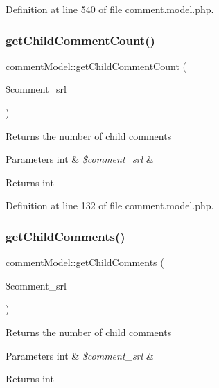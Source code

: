 Definition at line 540 of file comment.\+model.\+php.

\mbox{\label{classcommentModel_adfb890eecf72a039c9f7a28c1e6eb3d2}} 
\subsubsection{\texorpdfstring{get\+Child\+Comment\+Count()}{getChildCommentCount()}}
{\footnotesize\ttfamily comment\+Model\+::get\+Child\+Comment\+Count (\begin{DoxyParamCaption}\item[{}]{\$comment\+\_\+srl }\end{DoxyParamCaption})}

Returns the number of child comments 
\begin{DoxyParams}[1]{Parameters}
int & {\em \$comment\+\_\+srl} & \\
\hline
\end{DoxyParams}
\begin{DoxyReturn}{Returns}
int 
\end{DoxyReturn}


Definition at line 132 of file comment.\+model.\+php.

\mbox{\label{classcommentModel_ac1acb7d6d8da68e20ec5e6e5a55e5d32}} 
\subsubsection{\texorpdfstring{get\+Child\+Comments()}{getChildComments()}}
{\footnotesize\ttfamily comment\+Model\+::get\+Child\+Comments (\begin{DoxyParamCaption}\item[{}]{\$comment\+\_\+srl }\end{DoxyParamCaption})}

Returns the number of child comments 
\begin{DoxyParams}[1]{Parameters}
int & {\em \$comment\+\_\+srl} & \\
\hline
\end{DoxyParams}
\begin{DoxyReturn}{Returns}
int 
\end{DoxyReturn}


